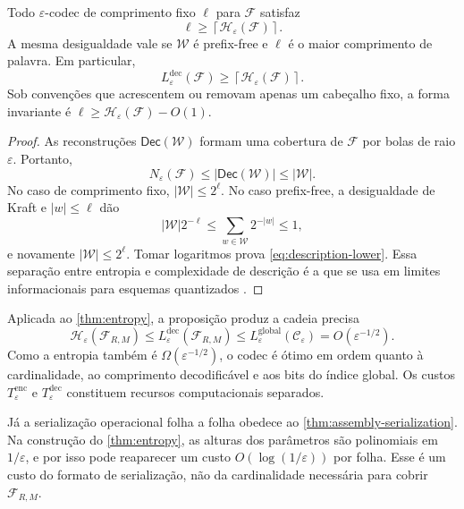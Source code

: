\begin{proposition}
\label{prop:description-lower}
Todo $\varepsilon$-codec de comprimento fixo $\ell$ para $\mathcal F$ satisfaz
\begin{equation}
 \ell\ge\left\lceil\mathcal H_\varepsilon(\mathcal F)\right\rceil.
 \label{eq:description-lower}
\end{equation}
A mesma desigualdade vale se $\mathcal W$ é prefix-free e $\ell$ é o maior
comprimento de palavra. Em particular,
\[
 L_\varepsilon^{\mathrm{dec}}(\mathcal F)
 \ge\left\lceil\mathcal H_\varepsilon(\mathcal F)\right\rceil.
\]
Sob convenções que acrescentem ou removam apenas um cabeçalho fixo, a forma
invariante é $\ell\ge\mathcal H_\varepsilon(\mathcal F)-O(1)$.
\end{proposition}

\begin{proof}
As reconstruções $\mathsf{Dec}(\mathcal W)$ formam uma cobertura de
$\mathcal F$ por bolas de raio $\varepsilon$. Portanto,
\[
 N_\varepsilon(\mathcal F)
 \le |\mathsf{Dec}(\mathcal W)|\le|\mathcal W|.
\]
No caso de comprimento fixo, $|\mathcal W|\le2^\ell$. No caso prefix-free, a
desigualdade de Kraft e $|w|\le\ell$ dão
\[
 |\mathcal W|2^{-\ell}
 \le\sum_{w\in\mathcal W}2^{-|w|}\le1,
\]
e novamente $|\mathcal W|\le2^\ell$. Tomar logaritmos prova
\eqref{eq:description-lower}. Essa separação entre entropia e complexidade de
descrição é a que se usa em limites informacionais para esquemas quantizados
\citep{bolcskei2019}.
\end{proof}

Aplicada ao \cref{thm:entropy}, a proposição produz a cadeia precisa
\begin{equation}
 \mathcal H_\varepsilon(\mathcal F_{R,M})
 \le L_\varepsilon^{\mathrm{dec}}(\mathcal F_{R,M})
 \le L_\varepsilon^{\mathrm{global}}(\mathcal C_\varepsilon)
 =O(\varepsilon^{-1/2}).
 \label{eq:complexity-chain}
\end{equation}
Como a entropia também é $\Omega(\varepsilon^{-1/2})$, o codec é ótimo em
ordem quanto à cardinalidade, ao comprimento decodificável e aos bits do
índice global. Os custos $T_\varepsilon^{\mathrm{enc}}$ e
$T_\varepsilon^{\mathrm{dec}}$ constituem recursos computacionais separados.

Já a serialização operacional folha a folha obedece ao
\cref{thm:assembly-serialization}. Na construção do \cref{thm:entropy}, as
alturas dos parâmetros são polinomiais em $1/\varepsilon$, e por isso pode
reaparecer um custo $O(\log(1/\varepsilon))$ por folha. Esse é um custo do
formato de serialização, não da cardinalidade necessária para cobrir
$\mathcal F_{R,M}$.

